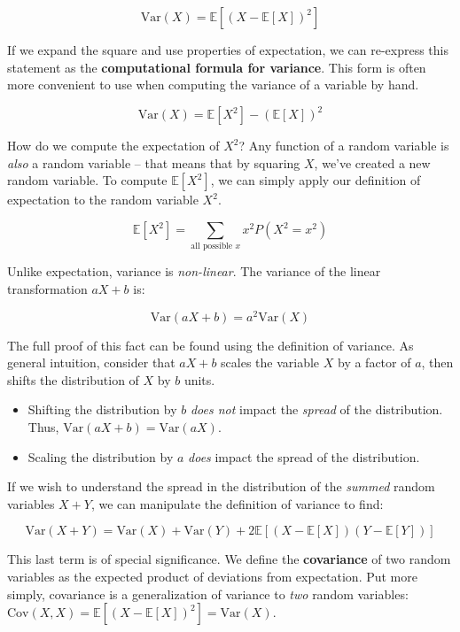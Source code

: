\documentclass[
  letterpaper,
  DIV=11,
  numbers=noendperiod]{scrreprt}
\providecommand{\tightlist}{%
  \setlength{\itemsep}{0pt}\setlength{\parskip}{0pt}}\usepackage{longtable,booktabs,array}
\begin{document}
\[\text{Var}(X) = \mathbb{E}[(X-\mathbb{E}[X])^2]\]

If we expand the square and use properties of expectation, we can
re-express this statement as the \textbf{computational formula for
variance}. This form is often more convenient to use when computing the
variance of a variable by hand.

\[\text{Var}(X) = \mathbb{E}[X^2] - (\mathbb{E}[X])^2\]

How do we compute the expectation of \(X^2\)? Any function of a random
variable is \emph{also} a random variable -- that means that by squaring
\(X\), we've created a new random variable. To compute
\(\mathbb{E}[X^2]\), we can simply apply our definition of expectation
to the random variable \(X^2\).

\[\mathbb{E}[X^2] = \sum_{\text{all possible } x} x^2 P(X^2 = x^2)\]

Unlike expectation, variance is \emph{non-linear}. The variance of the
linear transformation \(aX+b\) is:

\[\text{Var}(aX+b) = a^2 \text{Var}(X)\]

The full proof of this fact can be found using the definition of
variance. As general intuition, consider that \(aX+b\) scales the
variable \(X\) by a factor of \(a\), then shifts the distribution of
\(X\) by \(b\) units.

\begin{itemize}
\tightlist
\item
  Shifting the distribution by \(b\) \emph{does not} impact the
  \emph{spread} of the distribution. Thus,
  \(\text{Var}(aX+b) = \text{Var}(aX)\).
\item
  Scaling the distribution by \(a\) \emph{does} impact the spread of the
  distribution.
\end{itemize}

If we wish to understand the spread in the distribution of the
\emph{summed} random variables \(X + Y\), we can manipulate the
definition of variance to find:

\[\text{Var}(X + Y) = \text{Var}(X) + \text{Var}(Y) + 2\mathbb{E}[(X-\mathbb{E}[X])(Y-\mathbb{E}[Y])]\]

This last term is of special significance. We define the
\textbf{covariance} of two random variables as the expected product of
deviations from expectation. Put more simply, covariance is a
generalization of variance to \emph{two} random variables:
\(\text{Cov}(X, X) = \mathbb{E}[(X - \mathbb{E}[X])^2] = \text{Var}(X)\).
\end{document}

